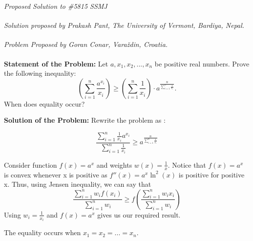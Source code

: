 \documentclass[12pt]{article}
\begin{document}
\textit{Proposed Solution to \#5815 SSMJ }\\ \\
\textit{Solution proposed by Prakash Pant, The University of Vermont, Bardiya, Nepal.}\\ \\
\textit{Problem Proposed by Goran Conar, Varaždin, Croatia.} \\ \\
\textbf{Statement of the Problem:}
Let \(a, x_1, x_2, . . . , x_n \) be positive real numbers. Prove the following inequality: \\
\[
\left( \sum_{i=1}^{n} \frac{a^{x_i}}{x_i} \right)
\ge
\left( \sum_{i=1}^{n} \frac{1}{x_i} \right)
\cdot
a^{\frac{n}{\sum_{i=1}^{n} \frac{1}{x_i}}}.
\]
When does equality occur?

\textbf{Solution of the Problem:}
Rewrite the problem as : 

\[\frac{\sum_{i=1}^{n} \frac{1}{x_i} a^{x_i}}{\sum_{i=1}^n \frac{1}{x_i}} \ge a ^{\frac{n}{\sum_{i=1}^n \frac{1}{x_i}}}  \]

Consider function \( f(x) = a^x\) and weights \( w(x) = \frac{1}{x}\). Notice that \(f(x) = a^x \) is convex whenever x is positive as \( f''(x) = a^x \ln^2(x)\) is positive for positive x. Thus, using Jensen inequality, we can say that 
\[ \frac{\sum_{i=1}^n w_i f(x_i)}{ \sum_{i=1}^n w_i} \ge f\left( \frac{\sum_{i=1}^n w_i x_i}{\sum_{i=1}^n w_i}\right)\]
Using \( w_i = \frac{1}{x_i}\) and \(f(x) = a^{x} \) gives us our required result. 

The equality occurs when \( x_1 = x_2 = ... = x_n\).
\end{document}
